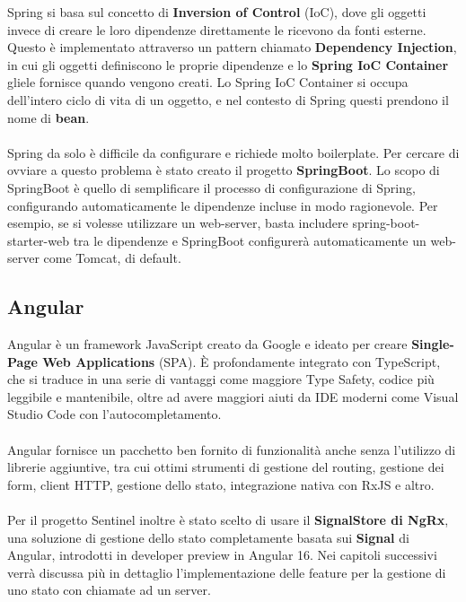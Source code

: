 Spring si basa sul concetto di \textbf{Inversion of Control} (IoC), dove gli oggetti invece di creare le loro dipendenze direttamente le ricevono da fonti esterne.
Questo \`e implementato attraverso un pattern chiamato \textbf{Dependency Injection}, in cui gli oggetti definiscono le proprie dipendenze e lo \textbf{Spring IoC Container}
gliele fornisce quando vengono creati.
Lo Spring IoC Container si occupa dell'intero ciclo di vita di un oggetto, e nel contesto di Spring questi prendono il nome di \textbf{bean}.
\\\\
Spring da solo \`e difficile da configurare e richiede molto boilerplate. Per cercare di ovviare a questo problema \`e stato creato il progetto \textbf{SpringBoot}.
Lo scopo di SpringBoot \`e quello di semplificare il processo di configurazione di Spring, configurando automaticamente le dipendenze incluse in modo ragionevole.
Per esempio, se si volesse utilizzare un web-server, basta includere spring-boot-starter-web tra le dipendenze e SpringBoot configurer\`a automaticamente un web-server come Tomcat, di default.
\subsection{Angular}
Angular \`e un framework JavaScript creato da Google e ideato per creare \textbf{Single-Page Web Applications} (SPA). \`E profondamente integrato con TypeScript,
che si traduce in una serie di vantaggi come maggiore Type Safety, codice pi\`u leggibile e mantenibile, oltre ad avere maggiori aiuti da IDE moderni come Visual Studio Code
con l'autocompletamento.
\\\\
Angular fornisce un pacchetto ben fornito di funzionalit\`a anche senza l'utilizzo di librerie aggiuntive, tra cui ottimi strumenti di gestione del
routing, gestione dei form, client HTTP, gestione dello stato, integrazione nativa con RxJS e altro.
\\\\
Per il progetto Sentinel inoltre \`e stato scelto di usare il \textbf{SignalStore di NgRx}, una soluzione di gestione dello stato completamente basata sui \textbf{Signal} di Angular,
introdotti in developer preview in Angular 16. Nei capitoli successivi verr\`a discussa pi\`u in dettaglio l'implementazione delle feature per la gestione di uno stato
con chiamate ad un server.
